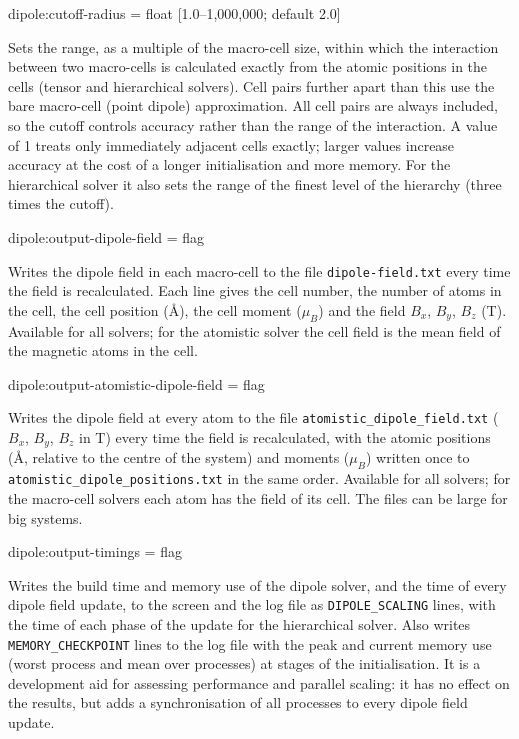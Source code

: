 {\zicf dipole:cutoff-radius = float [1.0--1,000,000; default 2.0]} Sets the range, as a multiple of the macro-cell size, within which the interaction between two macro-cells is calculated exactly from the atomic positions in the cells (tensor and hierarchical solvers). Cell pairs further apart than this use the bare macro-cell (point dipole) approximation. All cell pairs are always included, so the cutoff controls accuracy rather than the range of the interaction. A value of 1 treats only immediately adjacent cells exactly; larger values increase accuracy at the cost of a longer initialisation and more memory. For the hierarchical solver it also sets the range of the finest level of the hierarchy (three times the cutoff).

{\zicf dipole:output-dipole-field = flag} Writes the dipole field in each macro-cell to the file \texttt{dipole-field.txt} every time the field is recalculated. Each line gives the cell number, the number of atoms in the cell, the cell position (\AA), the cell moment ($\mu_B$) and the field $B_x$, $B_y$, $B_z$ (T). Available for all solvers; for the atomistic solver the cell field is the mean field of the magnetic atoms in the cell.

{\zicf dipole:output-atomistic-dipole-field = flag} Writes the dipole field at every atom to the file \texttt{atomistic\_dipole\_field.txt} ($B_x$, $B_y$, $B_z$ in T) every time the field is recalculated, with the atomic positions (\AA, relative to the centre of the system) and moments ($\mu_B$) written once to \texttt{atomistic\_dipole\_positions.txt} in the same order. Available for all solvers; for the macro-cell solvers each atom has the field of its cell. The files can be large for big systems.

{\zicf dipole:output-timings = flag} Writes the build time and memory use of the dipole solver, and the time of every dipole field update, to the screen and the log file as \texttt{DIPOLE\_SCALING} lines, with the time of each phase of the update for the hierarchical solver. Also writes \texttt{MEMORY\_CHECKPOINT} lines to the log file with the peak and current memory use (worst process and mean over processes) at stages of the initialisation. It is a development aid for assessing performance and parallel scaling: it has no effect on the results, but adds a synchronisation of all processes to every dipole field update.


